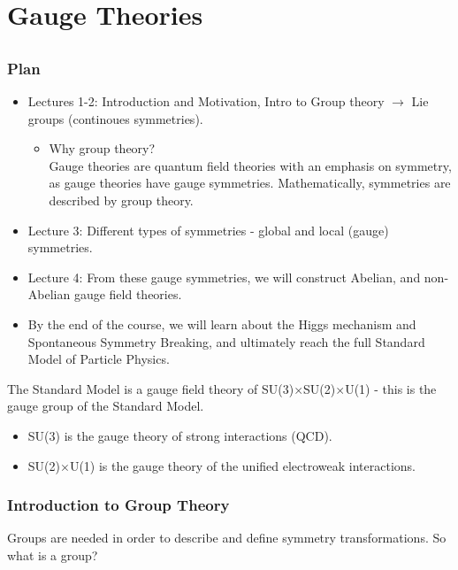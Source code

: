\documentclass[relqm.tex]{subfiles}
\begin{document}
\part{Gauge Theories}
\chapter{}
\section{Plan}
\begin{itemize}
    \item Lectures 1-2: Introduction and Motivation, Intro to Group theory $\to$ Lie groups (continoues symmetries).
        \begin{itemize}
            \item Why group theory?\\ Gauge theories are quantum field theories with an emphasis on symmetry, as gauge theories have gauge symmetries. Mathematically, symmetries are described by group theory. 
        \end{itemize}
    \item Lecture 3: Different types of symmetries - global and local (gauge) symmetries. 
    \item Lecture 4: From these gauge symmetries, we will construct Abelian, and non-Abelian gauge field theories. 
    \item By the end of the course, we will learn about the Higgs mechanism and Spontaneous Symmetry Breaking, and ultimately reach the full Standard Model of Particle Physics.
\end{itemize}
The Standard Model is a gauge field theory of SU(3)$\times$SU(2)$\times$U(1) - this is the gauge group of the Standard Model. 
\begin{itemize}
    \item SU(3) is the gauge theory of strong interactions (QCD).
    \item SU(2)$\times$U(1) is the gauge theory of the unified electroweak interactions.
\end{itemize}

\section{Introduction to Group Theory}
Groups are needed in order to describe and define symmetry transformations. 
So what is a group?
\end{document}
